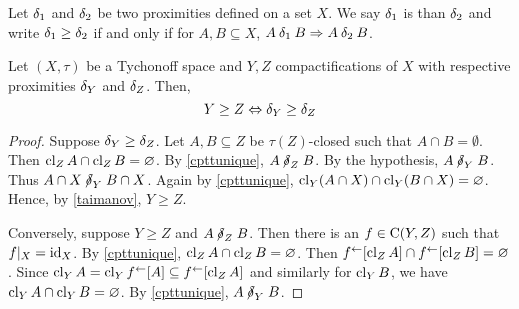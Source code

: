 \begin{definition}
	Let \( \mathord{\delta}_1 \) and \( \mathord{\delta}_2 \) be two proximities defined on a set \( X \).  We say \( \mathord{\delta}_1 \) is  than \( \mathord{\delta}_2 \) and write \( \mathord{\delta}_1 \geq \mathord{\delta}_2 \) if and only if for \( A,B \subseteq X \), \( A \mathbin{\delta}_1 B \Rightarrow A \mathbin{\delta}_2 B \).
\end{definition}

\begin{theorem}
	\label{geqdgeq}
	Let \( (X,\tau) \) be a Tychonoff space and \( Y,Z \) compactifications of \( X \) with respective proximities \( \mathord{\delta}_Y \) and \( \mathord{\delta}_Z \).  Then,
	\[ Y \geq Z \Leftrightarrow \mathord{\delta}_Y \geq \mathord{\delta}_Z \]
\end{theorem}
\begin{proof}
	Suppose \( \mathord{\delta}_Y \geq \mathord{\delta}_Z \).  Let \( A,B \subseteq Z \) be \( \tau(Z) \)-closed such that \( A \cap B = \emptyset \).  Then \( \operatorname{cl}_Z{A} \cap \operatorname{cl}_Z{B} = \varnothing \).  By \ref{cpttunique}, \( A \nnear_Z B \).  By the hypothesis, \( A \nnear_Y B \).  Thus \( A \cap X \nnear_Y B \cap X \).  Again by \ref{cpttunique}, \( \operatorname{cl}_Y(A \cap X) \cap \operatorname{cl}_Y(B \cap X) = \varnothing \).  Hence, by \ref{taimanov}, \( Y \geq Z \).
	
	Conversely, suppose \( Y \geq Z \) and \( A \nnear_Z B \).  Then there is an \( f \in \operatorname{C}(Y,Z) \) such that \( f|_X = \operatorname{id}_X \).  By \ref{cpttunique}, \( \operatorname{cl}_Z{A} \cap \operatorname{cl}_Z{B} = \varnothing \).  Then \( f^\leftarrow[\operatorname{cl}_Z{A}] \cap f^\leftarrow[\operatorname{cl}_Z{B}] = \varnothing \).  Since \( \operatorname{cl}_Y{A} = \operatorname{cl}_Y{f^\leftarrow[A]} \subseteq f^\leftarrow[\operatorname{cl}_Z{A}] \) and similarly for \( \operatorname{cl}_Y{B} \), we have \( \operatorname{cl}_Y{A} \cap \operatorname{cl}_Y{B} = \varnothing \).  By \ref{cpttunique}, \( A \nnear_Y B \).
\end{proof}
